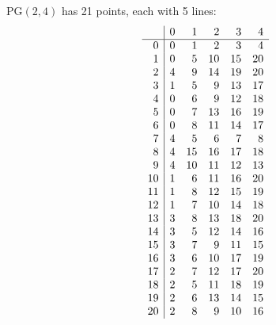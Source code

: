 {PG$(2, 4)$ has 21 points, each with 5 lines:\\
$$
\begin{array}{r|*{5}r}
 & 0 & 1 & 2 & 3 & 4\\
\hline
0 & 0 & 1 & 2 & 3 & 4\\
1 & 0 & 5 & 10 & 15 & 20\\
2 & 4 & 9 & 14 & 19 & 20\\
3 & 1 & 5 & 9 & 13 & 17\\
4 & 0 & 6 & 9 & 12 & 18\\
5 & 0 & 7 & 13 & 16 & 19\\
6 & 0 & 8 & 11 & 14 & 17\\
7 & 4 & 5 & 6 & 7 & 8\\
8 & 4 & 15 & 16 & 17 & 18\\
9 & 4 & 10 & 11 & 12 & 13\\
10 & 1 & 6 & 11 & 16 & 20\\
11 & 1 & 8 & 12 & 15 & 19\\
12 & 1 & 7 & 10 & 14 & 18\\
13 & 3 & 8 & 13 & 18 & 20\\
14 & 3 & 5 & 12 & 14 & 16\\
15 & 3 & 7 & 9 & 11 & 15\\
16 & 3 & 6 & 10 & 17 & 19\\
17 & 2 & 7 & 12 & 17 & 20\\
18 & 2 & 5 & 11 & 18 & 19\\
19 & 2 & 6 & 13 & 14 & 15\\
20 & 2 & 8 & 9 & 10 & 16\\
\end{array}
$$

}
